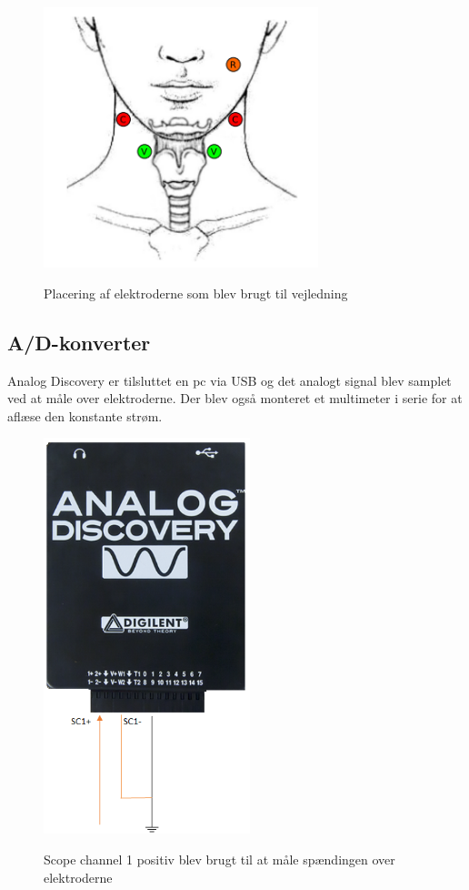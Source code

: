 \begin{figure}[H]
\centering
{\includegraphics[width=8cm]
{Figure/elektrodeplaceringREF}}
\caption{Placering af elektroderne som blev brugt til vejledning\cite{Nahrstaedt2012a}}
\label{fig:elektrodeplaceringREF}
\end{figure}





\subsection{A/D-konverter}

Analog Discovery er tilsluttet en pc via USB og det analogt signal blev samplet ved at måle over elektroderne. Der blev også monteret et multimeter i serie for at aflæse den konstante strøm.


\begin{figure}[H]
\centering
{\includegraphics[width=6cm]
{Figure/adkonverter}}
\caption{Scope channel 1 positiv blev brugt til at måle spændingen over elektroderne}
\label{fig:adkonverter}
\end{figure}

